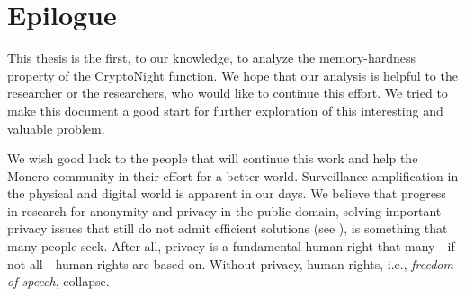 \section{Epilogue}
This thesis is the first, to our knowledge, to analyze the memory-hardness property of the CryptoNight function. We hope that our analysis is helpful to the researcher or the researchers, who would like to continue this effort. We tried to make this document a good start for further exploration of this interesting and valuable problem.

We wish good luck to the people that will continue this work and help the Monero community in their effort for a better world. Surveillance amplification in the physical and digital world is apparent in our days. We believe that progress in research for anonymity and privacy in the public domain, solving important privacy issues that still do not admit efficient solutions (see \cite{SoK}), is something that many people seek. After all, privacy is a fundamental human right that many - if not all - human rights are based on. Without privacy, human rights, i.e., \emph{freedom of speech}, collapse.
